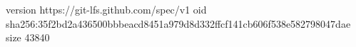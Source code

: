 version https://git-lfs.github.com/spec/v1
oid sha256:35f2bd2a436500bbbeacd8451a979d8d332ffcf141cb606f538e582798047dae
size 43840
